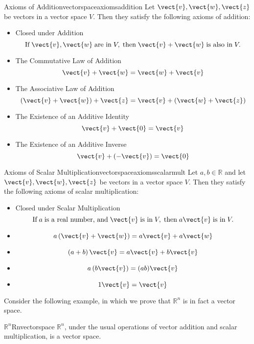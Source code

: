 \begin{definition}{Axioms of Addition}{vectorspaceaxiomsaddition}
Let $\vect{v}, \vect{w}, \vect{z}$ be vectors in a vector space $V$. Then they satisfy the following axioms of addition:

\begin{itemize}
\item Closed under Addition
\[ \mbox{If}\; \vect{v}, \vect{w} \;\mbox{are in}\; V, \;\mbox{then}\; \vect{v}+\vect{w} \;\mbox{is also in}\; V.
\] 
\item The Commutative Law of Addition
\[
\vect{v}+\vect{w}=\vect{w}+\vect{v}
\]
\item The Associative Law of Addition
\[
\left( \vect{v}+\vect{w}\right) +\vect{z}=\vect{v}+\left( \vect{w}+
\vect{z}\right) 
\]
\item The Existence of an Additive Identity
\[
\vect{v}+\vect{0}=\vect{v}
\]
\item The Existence of an Additive Inverse
\[
\vect{v}+\left( -\vect{v}\right) =\vect{0}
\]
\end{itemize}
\end{definition}

\begin{definition}{Axioms of Scalar Multiplication}{vectorspaceaxiomsscalarmult}
Let $a, b \in \mathbb{R}$ and let $\vect{v}, \vect{w}, \vect{z}$ be vectors in a vector space $V$. Then they satisfy the following axioms of scalar multiplication:

\begin{itemize}
\item Closed under Scalar Multiplication
\[ \mbox{If}\; a \;\mbox{is a real number, and}\; \vect{v} \;\mbox{is in}\; V, \;\mbox{then}\; a\vect{v} \;\mbox{is in}\; V.
\]
\item
\[
a \left( \vect{v}+\vect{w}\right) = a \vect{v}+ a \vect{w}  \label{e.01}
\]
\item
\[
\left( a + b \right) \vect{v}= a \vect{v}+ b \vect{v}
\label{e.02}
\]
\item
\[
a \left( b \vect{v}\right) = (a b) \vect{v}
\label{e.03}
\]
\item
\[
1\vect{v}=\vect{v}  \label{e.04}
\]
\end{itemize}
\end{definition}

Consider the following example, in which we prove that $\mathbb{R}^n$ is in fact a vector space.

\begin{example}{$\mathbb{R}^n$}{Rnvectorspace}
$\mathbb{R}^n$, under the usual operations of vector addition and scalar multiplication, is a vector space.
\end{example}


